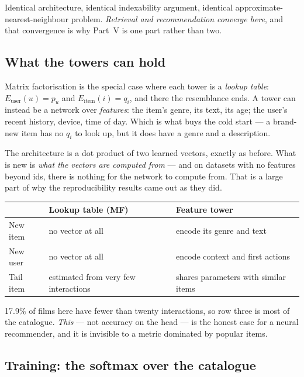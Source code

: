 \documentclass[11pt,a4paper]{article}
\begin{document}
Identical architecture, identical indexability argument, identical
approximate-nearest-neighbour problem. \emph{Retrieval and recommendation
converge here}, and that convergence is why Part~V is one part rather than two.

\subsection{What the towers can hold}

Matrix factorisation is the special case where each tower is a \emph{lookup
table}: $E_{\text{user}}(u) = p_u$ and $E_{\text{item}}(i) = q_i$, and there
the resemblance ends. A tower can instead be a network over \emph{features}:
the item's genre, its text, its age; the user's recent history, device, time of
day. Which is what buys the cold start --- a brand-new item has no $q_i$ to
look up, but it does have a genre and a description.

\begin{keybox}[title={The honest summary of ``neural recommenders''}]
The architecture is a dot product of two learned vectors, exactly as before.
What is new is \emph{what the vectors are computed from} --- and on datasets
with no features beyond ids, there is nothing for the network to compute from.
That is a large part of why the reproducibility results came out as they did.
\end{keybox}

\begin{center}
\small
\begin{tabular}{p{}p{}p{}}
\toprule
 & \textbf{Lookup table (MF)} & \textbf{Feature tower} \\
\midrule
New item  & no vector at all & encode its genre and text \\
New user  & no vector at all & encode context and first actions \\
Tail item & estimated from very few interactions & shares parameters with
similar items \\
\bottomrule
\end{tabular}
\end{center}

17.9\% of films here have fewer than twenty interactions, so row three is most
of the catalogue. \emph{This} --- not accuracy on the head --- is the honest
case for a neural recommender, and it is invisible to a metric dominated by
popular items.

\subsection{Training: the softmax over the catalogue}
\end{document}
